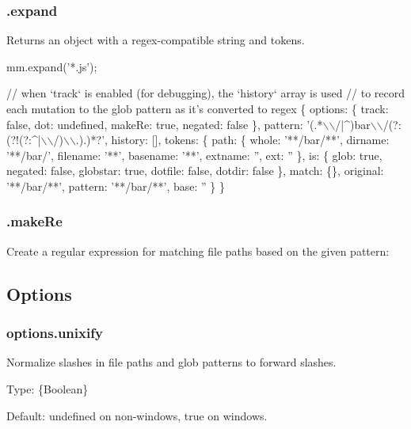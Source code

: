 \subsubsection*{.expand}

Returns an object with a regex-\/compatible string and tokens.


\begin{DoxyCode}
mm.expand('*.js');

// when `track` is enabled (for debugging), the `history` array is used
// to record each mutation to the glob pattern as it's converted to regex
\{ options: \{ track: false, dot: undefined, makeRe: true, negated: false \},
  pattern: '(.*\(\backslash\)\(\backslash\)/|^)bar\(\backslash\)\(\backslash\)/(?:(?!(?:^|\(\backslash\)\(\backslash\)/)\(\backslash\)\(\backslash\).).)*?',
  history: [],
  tokens:
   \{ path:
      \{ whole: '**/bar/**',
        dirname: '**/bar/',
        filename: '**',
        basename: '**',
        extname: '',
        ext: '' \},
     is:
      \{ glob: true,
        negated: false,
        globstar: true,
        dotfile: false,
        dotdir: false \},
     match: \{\},
     original: '**/bar/**',
     pattern: '**/bar/**',
     base: '' \} \}
\end{DoxyCode}


\subsubsection*{.make\+Re}

Create a regular expression for matching file paths based on the given pattern\+:




\subsection*{Options}

\subsubsection*{options.\+unixify}

Normalize slashes in file paths and glob patterns to forward slashes.

Type\+: {\ttfamily \{Boolean\}}

Default\+: {\ttfamily undefined} on non-\/windows, {\ttfamily true} on windows.

